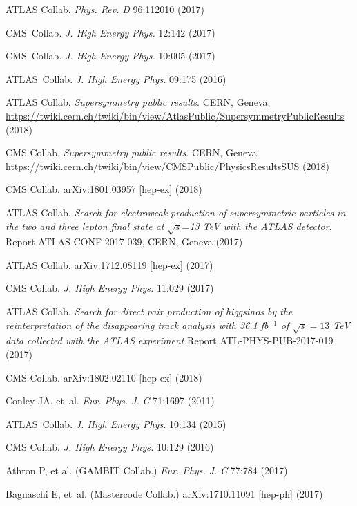 \documentclass{ar-1col}
\begin{document}
\begin{thebibliography}{175}
{ATLAS Collab.} \textit{Phys. Rev.} \textit{D} 96:112010 (2017)

{CMS~Collab.} \textit{J. High Energy Phys.} 12:142 (2017)

{CMS~Collab.} \textit{J. High Energy Phys.} 10:005 (2017)

{ATLAS~Collab.} \textit{J. High Energy Phys.} 09:175 (2016)

{ATLAS Collab}. \textit{Supersymmetry public results}. CERN, Geneva. \url{https://twiki.cern.ch/twiki/bin/view/AtlasPublic/SupersymmetryPublicResults} (2018)

{CMS Collab}. \textit{Supersymmetry public results}. CERN, Geneva.
\url{https://twiki.cern.ch/twiki/bin/view/CMSPublic/PhysicsResultsSUS} (2018)

{CMS Collab.} arXiv:1801.03957 [hep-ex] (2018)

ATLAS Collab. \textit{Search for electroweak production of supersymmetric particles in the two and three lepton final state at} $\sqrt{s}$=\textit{13 TeV with the ATLAS detector}.
Report ATLAS-CONF-2017-039, CERN, Geneva (2017)

{ATLAS Collab}. arXiv:1712.08119 [hep-ex] (2017)

{CMS Collab}. \textit{J. High Energy Phys.} 11:029 (2017)

{ATLAS Collab}. \textit{Search for direct pair production of higgsinos by the reinterpretation of the disappearing track analysis with 36.1 fb$^{-1}$ of $\sqrt{s}=13$ TeV data collected with the ATLAS experiment} Report ATL-PHYS-PUB-2017-019 (2017)
               
{CMS Collab}. arXiv:1802.02110 [hep-ex] (2018)

Conley JA, et~al. \textit{Eur. Phys. J.} \textit{C} 71:1697 (2011)

{ATLAS~Collab.} \textit{J. High Energy Phys.} 10:134 (2015)

{CMS Collab}. \textit{J. High Energy Phys.} 10:129 (2016)

{Athron P, et al. (GAMBIT Collab}.) \textit{Eur. Phys. J.} \textit{C} 77:784 (2017)

Bagnaschi E, et~al. (Mastercode Collab.) arXiv:1710.11091 [hep-ph] (2017)


\end{thebibliography}
\end{document}
